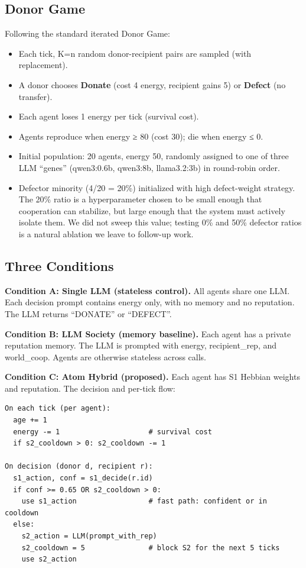 \documentclass[
  11pt,
  letterpaper,
]{article}
\providecommand{\tightlist}{%
  \setlength{\itemsep}{0pt}\setlength{\parskip}{0pt}}
\begin{document}
\subsection{Donor Game}\label{donor-game}

Following the standard iterated Donor Game:

\begin{itemize}
\tightlist
\item
  Each tick, K=n random donor-recipient pairs are sampled (with
  replacement).
\item
  A donor chooses \textbf{Donate} (cost 4 energy, recipient gains 5) or
  \textbf{Defect} (no transfer).
\item
  Each agent loses 1 energy per tick (survival cost).
\item
  Agents reproduce when energy ≥ 80 (cost 30); die when energy ≤ 0.
\item
  Initial population: 20 agents, energy 50, randomly assigned to one of
  three LLM ``genes'' (qwen3:0.6b, qwen3:8b, llama3.2:3b) in round-robin
  order.
\item
  Defector minority (4/20 = 20\%) initialized with high defect-weight
  strategy. The 20\% ratio is a hyperparameter chosen to be small enough
  that cooperation can stabilize, but large enough that the system must
  actively isolate them. We did not sweep this value; testing 0\% and
  50\% defector ratios is a natural ablation we leave to follow-up work.
\end{itemize}

\subsection{Three Conditions}\label{three-conditions}

\textbf{Condition A: Single LLM (stateless control).} All agents share
one LLM. Each decision prompt contains energy only, with no memory and
no reputation. The LLM returns ``DONATE'' or ``DEFECT''.

\textbf{Condition B: LLM Society (memory baseline).} Each agent has a
private reputation memory. The LLM is prompted with energy,
recipient\_rep, and world\_coop. Agents are otherwise stateless across
calls.

\textbf{Condition C: Atom Hybrid (proposed).} Each agent has S1 Hebbian
weights and reputation. The decision and per-tick flow:

\begin{verbatim}
On each tick (per agent):
  age += 1
  energy -= 1                     # survival cost
  if s2_cooldown > 0: s2_cooldown -= 1

On decision (donor d, recipient r):
  s1_action, conf = s1_decide(r.id)
  if conf >= 0.65 OR s2_cooldown > 0:
    use s1_action                 # fast path: confident or in cooldown
  else:
    s2_action = LLM(prompt_with_rep)
    s2_cooldown = 5               # block S2 for the next 5 ticks
    use s2_action
\end{verbatim}
\end{document}
